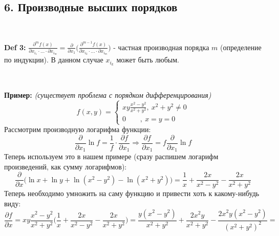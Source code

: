 \documentclass[book, 11pt]{report}
\begin{document}
        \subsection*{6. Производные высших порядков}
        \setcounter{equation}{0}
        \par{\ }
        \par{\textbf{Def 3: }$\displaystyle\frac{\partial^mf(x)}{\partial x_{i_1}\cdot\ldots\cdot\partial x_{i_m}}=\frac{\partial}{\partial x_1}\bigg(\frac{\partial^{m-1}f(x)}{\partial x_{i_2}\cdot\ldots\cdot\partial x_{i_m}}\bigg)$ - частная производная порядка $m$ (определение по индукции). В данном случае $x_{i_k}$ может быть любым.}
        \par
        \noindent\hrulefill\noindent
        \par{\ }
        \par{\textbf{Пример: }\textit{(существует проблема с порядком дифференцирования)}
        \begin{equation*}
            f(x,y)=\begin{cases}
                xy\frac{x^2-y^2}{x^2+y^2}, \ x^2+y^2\ne0 \\
                0 \ \ \ \ \ \ \ \ \ , \ x=y=0
            \end{cases}
        \end{equation*}
        Рассмотрим производную логарифма функции:
        \begin{equation*}
            \frac{\partial}{\partial x_1}\ln{f}=\frac{1}{f}\cdot\frac{\partial f}{\partial x_1}\Rightarrow\frac{\partial f}{\partial x_1}=f\frac{\partial}{\partial x_1}\ln{f}
        \end{equation*}
        Теперь используем это в нашем примере (сразу распишем логарифм произведений, как сумму логарифмов):
        \begin{equation*}
            \frac{\partial}{\partial x}\bigg(\ln{x}+\ln{y}+\ln{(x^2-y^2)}-\ln{(x^2+y^2)}\bigg)=\frac{1}{x}+\frac{2x}{x^2-y^2}-\frac{2x}{x^2+y^2}
        \end{equation*}
        }
        Теперь необходимо умножить на саму функцию и привести хоть к какому-нибудь виду:
        \begin{equation*}
            \frac{\partial f}{\partial x}=xy\frac{x^2-y^2}{x^2+y^2}\bigg(\frac{1}{x}+\frac{2x}{x^2-y^2}-\frac{2x}{x^2+y^2}\bigg)=\frac{y(x^2-y^2)}{x^2+y^2}+\frac{2x^2y}{x^2+y^2}-\frac{2x^2y(x^2-y^2)}{(x^2+y^2)^2}=
        \end{equation*}
\end{document}
